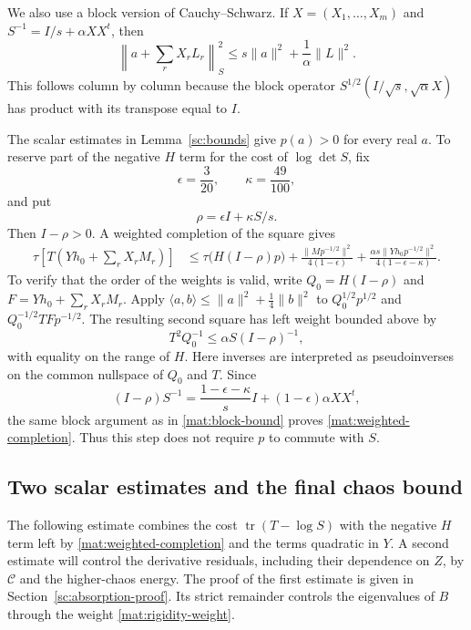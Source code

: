 \documentclass[11pt]{article}
\DeclareMathOperator{\tr}{tr}
\newcommand{\Id}{I}
\theoremstyle{definition}
\theoremstyle{remark}
\numberwithin{equation}{section}
\begin{document}
We also use a block version of Cauchy--Schwarz.  If
$X=(X_1,\ldots,X_m)$ and $S^{-1}=\Id/s+\alpha XX^t$, then
\begin{equation}\label{mat:block-bound}
 \left\|a+\sum_rX_rL_r\right\|_S^2
 \le s\|a\|^2+\frac1\alpha\|L\|^2.
\end{equation}
This follows column by column because the block operator
$S^{1/2}(\Id/\sqrt{s},\sqrt{\alpha}X)$ has product with its transpose
equal to $\Id$.

The scalar estimates in Lemma~\ref{sc:bounds} give $p(a)>0$ for every
real $a$.  To reserve part of the negative $H$ term for the cost of
$\log\det S$, fix
\begin{equation}\label{mat:completion-constants}
 \epsilon=\frac3{20},\qquad\kappa=\frac{49}{100},
\end{equation}
and put
\[
 \rho=\epsilon\Id+\kappa S/s.
\]
Then $\Id-\rho>0$.  A weighted completion of the square gives
\begin{align}
 \tau\left[T\left(Yh_0+\sum_rX_rM_r\right)\right]
 &\le\tau\bigl(H(\Id-\rho)p\bigr)
       +\frac{\|M p^{-1/2}\|^2}{4(1-\epsilon)}
       +\frac{\alpha s\|Yh_0p^{-1/2}\|^2}
                    {4(1-\epsilon-\kappa)}.
 \label{mat:weighted-completion}
\end{align}
To verify that the order of the weights is valid, write
$Q_0=H(\Id-\rho)$ and $F=Yh_0+\sum_rX_rM_r$.
Apply $\langle a,b\rangle\le\|a\|^2+\frac14\|b\|^2$ to
$Q_0^{1/2}p^{1/2}$ and $Q_0^{-1/2}TFp^{-1/2}$.
The resulting second square has left weight bounded above by
\[
 T^2Q_0^{-1}\le\alpha S(\Id-\rho)^{-1},
\]
with equality on the range of $H$.  Here inverses are interpreted as
pseudoinverses on the common nullspace of $Q_0$ and $T$.
Since
\[
 (\Id-\rho)S^{-1}
   =\frac{1-\epsilon-\kappa}{s}\Id
           +(1-\epsilon)\alpha XX^t,
\]
the same block argument as in \eqref{mat:block-bound} proves
\eqref{mat:weighted-completion}.  Thus this step does not require $p$
to commute with $S$.

\subsection{Two scalar estimates and the final chaos bound}

The following estimate combines the cost $\tr(T-\log S)$ with the
negative $H$ term left by \eqref{mat:weighted-completion} and the
terms quadratic in $Y$.  A second estimate will control the derivative
residuals, including their dependence on $Z$, by $\mathcal C$ and the
higher-chaos energy.  The proof of the first estimate is given in
Section~\ref{sc:absorption-proof}.  Its strict remainder controls the
eigenvalues of $B$ through the weight \eqref{mat:rigidity-weight}.
\end{document}
